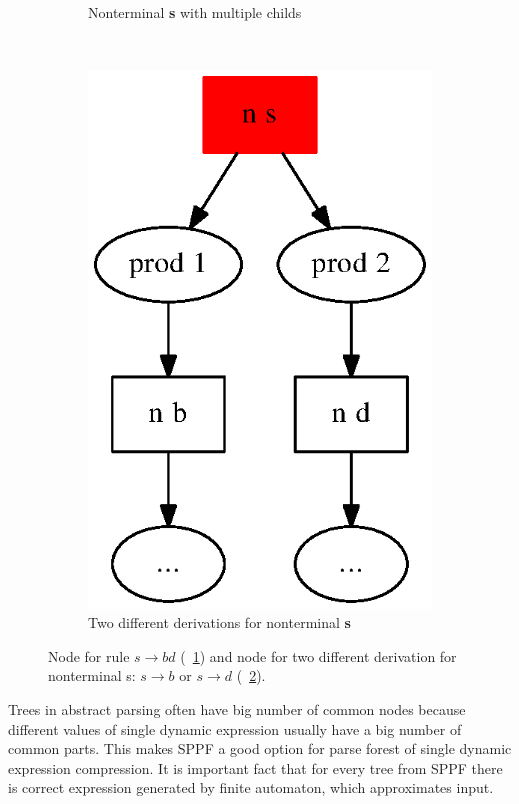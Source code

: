 \documentclass{acm_proc_article-sp}
\begin{document}
\begin{figure}[h!]
\begin{center}
\begin{subfigure}{0.2\textwidth}
    \caption{Nonterminal {\bf s} with multiple childs}
    \label{s_childs}
    \end{subfigure}
    ~
    \begin{subfigure}{0.2\textwidth}      
            \includegraphics[scale=0.3]{graphs/SPPF_idea2.eps}        
        \caption{Two different derivations  for nonterminal {\bf s}}
        \label{2_derivations}
    \end{subfigure}
    \caption{Node for rule $s \to b d$ (~\ref{s_childs}) and node for two different derivation for nonterminal s: $s \to b$ or $s \to d$ (~\ref{2_derivations}).}
    \label{sppf_idea}
  \end{center}
\end{figure}

Trees in abstract parsing often have big number of common nodes because different values of single dynamic expression usually have a big number of common parts. This makes SPPF a good option for parse forest of single dynamic expression compression. It is important fact that for every tree from SPPF there is correct expression generated by finite automaton, which approximates input.
\end{document}
